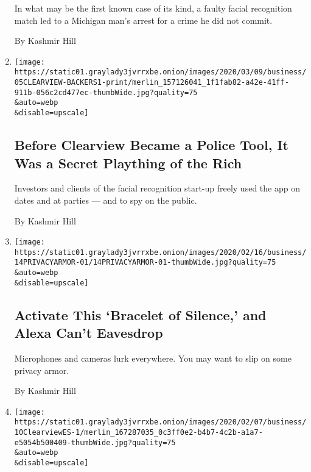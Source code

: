 \begin{enumerate}
  In what may be the first known case of its kind, a faulty facial
  recognition match led to a Michigan man's arrest for a crime he did
  not commit.

  By Kashmir Hill
\item
  \href{/2020/03/05/technology/clearview-investors.html}{}

  \texttt{[image: https://static01.graylady3jvrrxbe.onion/images/2020/03/09/business/05CLEARVIEW-BACKERS1-print/merlin\_157126041\_1f1fab82-a42e-41ff-911b-056c2cd477ec-thumbWide.jpg?quality=75\\\&auto=webp\\\&disable=upscale]}

  \hypertarget{before-clearview-became-a-police-tool-it-was-a-secret-plaything-of-the-rich}{%
  \subsection{Before Clearview Became a Police Tool, It Was a Secret
  Plaything of the
  Rich}\label{before-clearview-became-a-police-tool-it-was-a-secret-plaything-of-the-rich}}

  Investors and clients of the facial recognition start-up freely used
  the app on dates and at parties --- and to spy on the public.

  By Kashmir Hill
\item
  \href{/2020/02/14/technology/alexa-jamming-bracelet-privacy-armor.html}{}

  \texttt{[image: https://static01.graylady3jvrrxbe.onion/images/2020/02/16/business/14PRIVACYARMOR-01/14PRIVACYARMOR-01-thumbWide.jpg?quality=75\\\&auto=webp\\\&disable=upscale]}

  \hypertarget{activate-this-bracelet-of-silence-and-alexa-cant-eavesdrop}{%
  \subsection{Activate This `Bracelet of Silence,' and Alexa Can't
  Eavesdrop}\label{activate-this-bracelet-of-silence-and-alexa-cant-eavesdrop}}

  Microphones and cameras lurk everywhere. You may want to slip on some
  privacy armor.

  By Kashmir Hill
\item
  \href{/es/2020/02/10/espanol/negocios/clearview-reconocimiento-facial.html}{}

  \texttt{[image: https://static01.graylady3jvrrxbe.onion/images/2020/02/07/business/10ClearviewES-1/merlin\_167287035\_0c3ff0e2-b4b7-4c2b-a1a7-e5054b500409-thumbWide.jpg?quality=75\\\&auto=webp\\\&disable=upscale]}


\end{enumerate}
